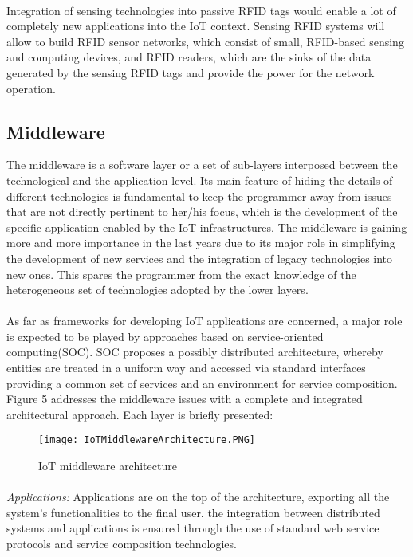 \documentclass[10pt, twocolumn]{article}
\begin{document}
\paragraph{}
Integration of sensing technologies into passive RFID tags would enable a lot of completely new applications into the IoT context. Sensing RFID systems will allow to build RFID sensor networks, which consist of small, RFID-based sensing and computing devices, and RFID readers, which are the sinks of the data generated by the sensing RFID tags and provide the power for the network operation.

\subsection{Middleware}
The middleware is a software layer or a set of sub-layers interposed between the technological and the application level. Its main feature of hiding the details of different technologies is fundamental to keep the programmer away from issues that are not directly pertinent to her/his focus, which is the development of the specific application enabled by the IoT infrastructures. The middleware is gaining more and more importance in the last years due to its major role in simplifying the development of new services and the integration of legacy technologies into new ones. This spares the programmer from the exact knowledge of the heterogeneous set of technologies adopted by the lower layers\cite{ref3}.
\paragraph{}
As far as frameworks for developing IoT applications are concerned, a major role is expected to be played by approaches
based on service-oriented computing(SOC). SOC proposes a possibly distributed architecture, whereby entities are treated in a uniform way and accessed via standard interfaces providing a common set of services and an environment for service composition. Figure 5 addresses the middleware issues with a complete and integrated architectural approach. Each layer is briefly presented:
\begin{figure}
\begin{center}
\texttt{[image: IoTMiddlewareArchitecture.PNG]}
\end{center}
\caption{IoT middleware architecture}
\end{figure}
\paragraph{}
\emph{Applications: } Applications are on the top of the architecture, exporting all the system’s functionalities to the final user. the integration between distributed systems and applications is ensured through the use of standard web service protocols and service composition technologies.\\
\end{document}
